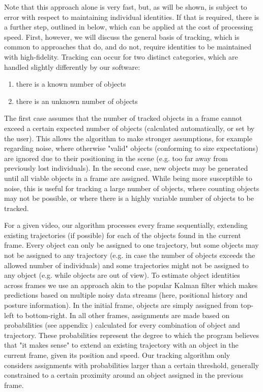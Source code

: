 \documentclass[9pt,lineno]{elife}
\begin{document}
Note that this approach alone is very fast, but, as will be shown, is subject to error with respect to maintaining individual identities. If that is required, there is a further step, outlined in  below, which can be applied at the cost of processing speed. First, however, we will discuss the general basis of tracking, which is common to approaches that do, and do not, require identities to be maintained with high-fidelity. Tracking can occur for two distinct categories, which are handled slightly differently by our software:
\begin{enumerate}
  \item there is a known number of objects
  \item there is an unknown number of objects
\end{enumerate}

The first case assumes that the number of tracked objects in a frame cannot exceed a certain expected number of objects ({\color{blue}calculated} automatically{\color{blue},} or set by the user). This allows the algorithm to make stronger assumptions, for example regarding noise, where otherwise "valid" objects (conforming to size expectations) are ignored due to their positioning in the scene (e.g. too far away from previously lost individuals). In the second case, new objects may be generated until all viable objects in a frame are assigned. While being more susceptible to noise, this is useful for tracking a large number of objects, where counting objects may not be possible, or where there is a highly variable number of objects to be tracked.

For a given video, our algorithm processes every frame sequentially, extending existing trajectories (if possible) for each of the objects found in the current frame. Every object can only be assigned to one trajectory, but some objects may not be assigned to any trajectory (e.g. in case the number of objects exceeds the allowed number of individuals) and some trajectories might not be assigned to any object (e.g. while objects are out of view). To estimate object identities across frames we use an approach akin to the popular Kalman filter \citep{kalman1960new} which makes predictions based on multiple noisy data streams (here, positional history and posture information).  
In the initial frame, objects are simply assigned from top-left to bottom-right. In all other frames, assignments are made based on probabilities (see appendix ) calculated for every combination of object and trajectory. These probabilities represent the degree to which the program believes that "it makes sense" to extend an existing trajectory with an object in the current frame, given its position and speed. Our tracking algorithm only considers assignments with probabilities larger than a certain threshold, generally constrained to a certain proximity around an object assigned in the previous frame. 
\end{document}
